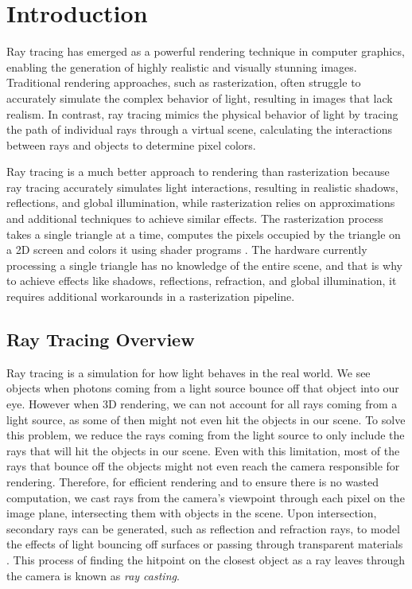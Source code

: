 \documentclass[conference]{IEEEtran}
\begin{document}
\section{Introduction} \label{introduction}
Ray tracing has emerged as a powerful rendering technique in computer graphics, enabling the generation of highly realistic and visually stunning images. Traditional rendering approaches, such as rasterization, often struggle to accurately simulate the complex behavior of light, resulting in images that lack realism. In contrast, ray tracing mimics the physical behavior of light by tracing the path of individual rays through a virtual scene, calculating the interactions between rays and objects to determine pixel colors.

Ray tracing is a much better approach to rendering than rasterization because ray tracing accurately simulates light interactions, resulting in realistic shadows, reflections, and global illumination, while rasterization relies on approximations and additional techniques to achieve similar effects. The rasterization process takes a single triangle at a time, computes the pixels occupied by the triangle on a 2D screen and colors it using shader programs \cite{NVIDIA_raytracing_vs_rasterization}. The hardware currently processing a single triangle has no knowledge of the entire scene, and that is why to achieve effects like shadows, reflections, refraction, and global illumination, it requires additional workarounds in a rasterization pipeline.

\subsection{Ray Tracing Overview}
Ray tracing is a simulation for how light behaves in the real world. We see objects when photons coming from a light source bounce off that object into our eye. However when 3D rendering, we can not account for all rays coming from a light source, as some of then might not even hit the objects in our scene. To solve this problem, we reduce the rays coming from the light source to only include the rays that will hit the objects in our scene. Even with this limitation, most of the rays that bounce off the objects might not even reach the camera responsible for rendering. Therefore, for efficient rendering and to ensure there is no wasted computation, we cast rays from the camera's viewpoint through each pixel on the image plane, intersecting them with objects in the scene. Upon intersection, secondary rays can be generated, such as reflection and refraction rays, to model the effects of light bouncing off surfaces or passing through transparent materials \cite{Ray_Tracing_Gems}. This process of finding the hitpoint on the closest object as a ray leaves through the camera is known as \textit{ray casting}. 
\end{document}

